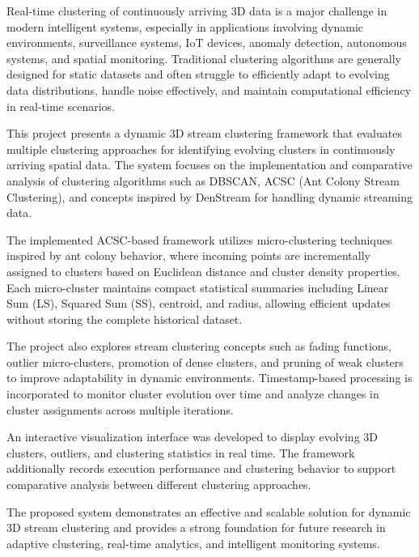 \documentclass[12pt,a4paper]{report}
\begin{document}
Real-time clustering of continuously arriving 3D data is a major challenge in modern intelligent systems, especially in applications involving dynamic environments, surveillance systems, IoT devices, anomaly detection, autonomous systems, and spatial monitoring. Traditional clustering algorithms are generally designed for static datasets and often struggle to efficiently adapt to evolving data distributions, handle noise effectively, and maintain computational efficiency in real-time scenarios.

This project presents a dynamic 3D stream clustering framework that evaluates multiple clustering approaches for identifying evolving clusters in continuously arriving spatial data. The system focuses on the implementation and comparative analysis of clustering algorithms such as DBSCAN, ACSC (Ant Colony Stream Clustering), and concepts inspired by DenStream for handling dynamic streaming data.

The implemented ACSC-based framework utilizes micro-clustering techniques inspired by ant colony behavior, where incoming points are incrementally assigned to clusters based on Euclidean distance and cluster density properties. Each micro-cluster maintains compact statistical summaries including Linear Sum (LS), Squared Sum (SS), centroid, and radius, allowing efficient updates without storing the complete historical dataset.

The project also explores stream clustering concepts such as fading functions, outlier micro-clusters, promotion of dense clusters, and pruning of weak clusters to improve adaptability in dynamic environments. Timestamp-based processing is incorporated to monitor cluster evolution over time and analyze changes in cluster assignments across multiple iterations.

An interactive visualization interface was developed to display evolving 3D clusters, outliers, and clustering statistics in real time. The framework additionally records execution performance and clustering behavior to support comparative analysis between different clustering approaches.

The proposed system demonstrates an effective and scalable solution for dynamic 3D stream clustering and provides a strong foundation for future research in adaptive clustering, real-time analytics, and intelligent monitoring systems.

\end{document}

